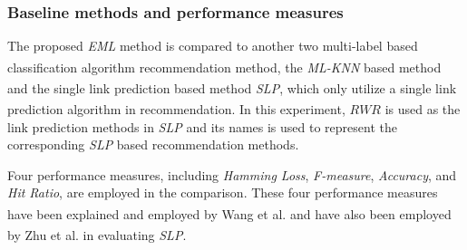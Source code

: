 \documentclass[review,3p,twocolumn,times]{elsarticle}
\newcommand{\upcite}[1]{\textsuperscript{\cite{#1}}}
\begin{document}
%
%		
%		
%		
%		
%		

\subsubsection{Baseline methods and performance measures}

The proposed \emph{EML} method is compared to another two multi-label based classification algorithm recommendation method, the \emph{ML-KNN} based method\upcite{Wang2014A} and the single link prediction based method \emph{SLP}\upcite{Zhu2018A}, which only utilize a single link prediction algorithm in recommendation. In this experiment, $ RWR $\upcite{liu2010link} is used as the link prediction methods in \emph{SLP} and its names is used to represent the corresponding \emph{SLP} based recommendation methods. %

Four performance measures, including \emph{Hamming Loss}, \emph{F-measure}, \emph{Accuracy}, and \emph{Hit Ratio}, are employed in the comparison. These four performance measures have been explained and employed by Wang et al.\upcite{Wang2014A} and have also been employed by Zhu et al.\upcite{Zhu2018A} in evaluating \emph{SLP}.
\end{document}
